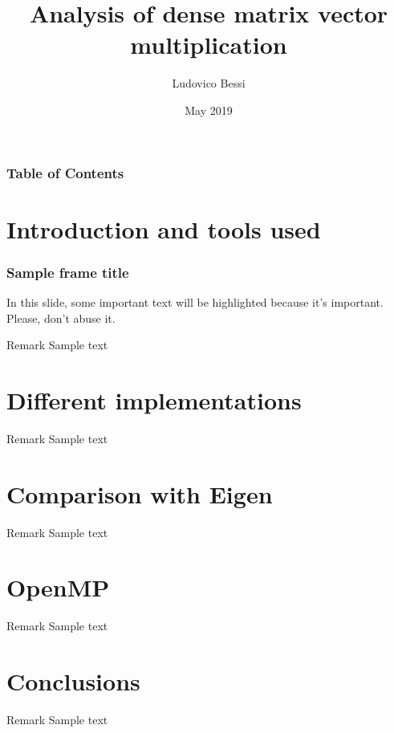 \documentclass{beamer}
\title {Analysis of dense matrix vector multiplication}
\author %
{Ludovico Bessi}
\institute[VFU] %
{
  Matematica per l'ingegneria\\
  Politecnico di Torino
}
\date{May 2019}
\begin{document}
 
\frame{\titlepage}

\begin{frame}
\frametitle{Table of Contents}
\tableofcontents
\end{frame}

\section{Introduction and tools used}
\begin{frame}
\frametitle{Sample frame title}
In this slide, some important text will be
\alert{highlighted} because it's important.
Please, don't abuse it.
\begin{block}{Remark}
Sample text
\end{block}
\end{frame}



\section{Different implementations}
\begin{frame}
\begin{block}{Remark}
Sample text
\end{block}
\end{frame}

\section{Comparison with Eigen}
\begin{frame}
\begin{block}{Remark}
Sample text
\end{block}
\end{frame}

\section{OpenMP}
\begin{frame}
\begin{block}{Remark}
Sample text
\end{block}
\end{frame}

\section{Conclusions}
\begin{frame}
\begin{block}{Remark}
Sample text
\end{block}
\end{frame}

 
\end{document}
